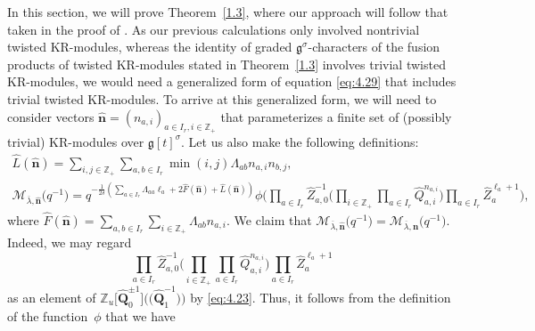 \documentclass[pdftex]{sigma}
\numberwithin{equation}{section}
\begin{document}
In this section, we will prove Theorem~\ref{1.3}, where our approach will follow that taken in the proof of \cite[Section 5]{Lin21}. As our previous calculations only involved nontrivial twisted KR-modules, whereas the identity of graded $\mathfrak{g}^{ \sigma}$-characters of the fusion products of twisted KR-modules stated in Theorem~\ref{1.3} involves trivial twisted KR-modules, we would need a generalized form of equation \eqref{eq:4.29} that includes trivial twisted KR-modules. To arrive at this generalized form, we will need to consider vectors $\widehat{\mathbf{n}}=(n_{a,i})_{a\in I_r,i\in\mathbb{Z}_+}$ that parameterizes a finite set of (possibly trivial) KR-modules over $\mathfrak{g}[t]^{\sigma}$. Let us also make the following definitions:
\begin{gather*}
\widehat{L}(\widehat{\mathbf{n}})
=\sum_{i,j\in\mathbb{Z}_+}\sum_{a,b\in I_r}\min(i,j)\Lambda_{ab} n_{a,i}n_{b,j},\\
\mathcal{M}_{\overline{\lambda},\widehat{\mathbf{n}}}\bigl(q^{-1}\bigr)
=q^{-\frac{1}{2\delta}(\sum_{a\in I_r}\Lambda_{aa}\ell_a+2\widehat{F}(\widehat{\mathbf{n}})+\widehat{L}(\widehat{\mathbf{n}}))}\phi\biggl(\prod_{a\in I_r}\widehat{Z}_{a,0}^{-1}\biggl(\prod_{i\in\mathbb{Z}_+}\prod_{a\in I_r}\widehat{Q}_{a,i}^{n_{a,i}}\biggr)\prod_{a\in I_r}\widehat{Z}_a^{\ell_a+1}\biggr),
\end{gather*}
where
$
\widehat{F}(\widehat{\mathbf{n}})=
\sum_{a,b\in I_r}\sum_{i\in\mathbb{Z}_+}\Lambda_{ab}n_{a,i}$.
We claim that $\mathcal{M}_{\overline{\lambda},\widehat{\mathbf{n}}}\bigl(q^{-1}\bigr)=\mathcal{M}_{\overline{\lambda},\mathbf{n}}\bigl(q^{-1}\bigr)$. Indeed, we may regard
\begin{equation*}
\prod_{a\in I_r}\widehat{Z}_{a,0}^{-1}\biggl(\prod_{i\in\mathbb{Z}_+}\prod_{a\in I_r}\widehat{Q}_{a,i}^{n_{a,i}}\biggr)\prod_{a\in I_r}\widehat{Z}_a^{\ell_a+1}
\end{equation*}
as an element of $\mathbb{Z}_u\bigl[\widehat{\mathbf{Q}}_0^{\pm1}\bigr]\bigl(\bigl(\widehat{\mathbf{Q}}_1^{-1}\bigr)\bigr)$ by \eqref{eq:4.23}. Thus, it follows from the definition of the function~$\phi$ that we have
\end{document}
